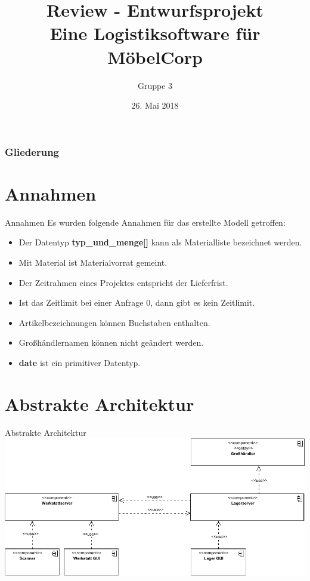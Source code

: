 \documentclass{beamer}
\begin{document}
			
	
	\title[Review - Entwurfsprojekt]{Review - Entwurfsprojekt\\ Eine Logistiksoftware für MöbelCorp}
	\author{Gruppe 3}
	
	 \begin{frame}[title=Hauptgebaeude_Nacht.jpg]
	 	\maketitle
	 	\date{26. Mai 2018}
 	\end{frame}
	 
	\begin{frame}
		\frametitle{Gliederung}
		\tableofcontents
	\end{frame}
	\section*{Annahmen}
	\begin{frame}{Annahmen}
	Es wurden folgende Annahmen für das erstellte Modell getroffen:
	\begin{itemize}
		\item Der Datentyp \textbf{typ\_und\_menge[]} kann als Materialliste bezeichnet werden.
		\item Mit Material ist Materialvorrat gemeint.
		\item Der Zeitrahmen eines Projektes entspricht der Lieferfrist.
		\item Ist das Zeitlimit bei einer Anfrage 0, dann gibt es kein Zeitlimit.
		\item Artikelbezeichnungen können Buchstaben enthalten.
		\item Großhändlernamen können nicht geändert werden.
		\item \textbf{date} ist ein primitiver Datentyp.
	\end{itemize}
	\end{frame}
	\section{Abstrakte Architektur}
	\begin{frame}{Abstrakte Architektur}
		\includegraphics[width=\textwidth]{PDF/abstrakte_Architektur.pdf}
	\end{frame}
\end{document}
